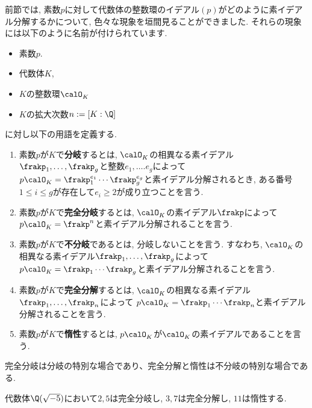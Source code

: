 \documentclass[11pt,b5paper,oneside,titlepage,lualatex]{ltjsreport}
\begin{document}

前節では, 素数$ p $に対して代数体の整数環のイデアル$ (p) $がどのように素イデアル分解するかについて, 色々な現象を垣間見ることができました. 
それらの現象には以下のように名前が付けられています. 

\begin{dfn}{}{}
	\begin{itemize}
		\item 素数$ p $.
		\item 代数体$ K $,
		\item $ K $の整数環$ \calO_K^{} $
		\item $ K $の拡大次数$ n := [K : \Q] $
	\end{itemize}
	に対し以下の用語を定義する. 
	\begin{enumerate}
		\item 素数$ p $が$ K $で\textbf{分岐}するとは, $ \calO_K^{} $の相異なる素イデアル$ \frakp_1, \dots, \frakp_g $と整数$ e_1, \dots. e_g $によって
		$ p \calO_K^{} = \frakp_1^{e_1} \cdots \frakp_g^{e_g} $と素イデアル分解されるとき, ある番号$ 1 \le i \le g $が存在して$ e_i \ge 2 $が成り立つことを言う. 
		\item 素数$ p $が$ K $で\textbf{完全分岐}するとは, $ \calO_K^{} $の素イデアル$ \frakp $によって
		$ p \calO_K^{} = \frakp^{n} $と素イデアル分解されることを言う. 
		\item 素数$ p $が$ K $で\textbf{不分岐}であるとは, 分岐しないことを言う. 
		すなわち, $ \calO_K^{} $の相異なる素イデアル$ \frakp_1, \dots, \frakp_g $によって
		$ p \calO_K^{} = \frakp_1 \cdots \frakp_g $と素イデアル分解されることを言う. 
		\item 素数$ p $が$ K $で\textbf{完全分解}するとは, $ \calO_K^{} $の相異なる素イデアル$ \frakp_1, \dots, \frakp_n $によって
		$ p \calO_K^{} = \frakp_1 \cdots \frakp_n $と素イデアル分解されることを言う. 
		\item 素数$ p $が$ K $で\textbf{惰性}するとは, $ p \calO_K^{} $が$ \calO_K^{} $の素イデアルであることを言う. 
	\end{enumerate}
\end{dfn}

\begin{rem}{}{}
	完全分岐は分岐の特別な場合であり、完全分解と惰性は不分岐の特別な場合である. 
\end{rem}

\begin{ex}{}{}
	代数体$ \Q(\sqrt{-5}) $において$ 2, 5 $は完全分岐し, $ 3, 7 $は完全分解し, $ 11 $は惰性する. 
\end{ex}
\end{document}
